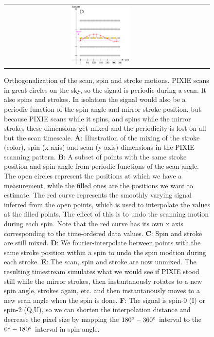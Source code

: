 \documentclass{article}
\begin{document}
\begin{figure}
\begin{tabular}{ccc}
		\includegraphics[width=0.32\textwidth]{plots/shift4.pdf}
	\end{tabular}
	\caption{Orthogonalization of the scan, spin and stroke
	motions. PIXIE scans in great circles on the sky, so the
	signal is periodic during a scan. It also spins and strokes.
	In isolation the signal would also be a periodic function
	of the spin angle and mirror stroke position, but because
	PIXIE scans while it spins, and spins
	while the mirror strokes these dimensions get mixed and the
	periodicity is lost on all but the scan timescale.
	\textbf{A}: Illustration of the mixing of the stroke (color),
	spin (x-axis) and scan (y-axis) dimensions in the PIXIE scanning
	pattern. \textbf{B}: A subset of points with the same stroke
	position and spin angle from periodic functions of the scan
	angle. The open circles represent the positions at which
	we have a measurement, while the filled ones are the positions
	we want to estimate. The red curve represents the smoothly
	varying signal inferred from the open points, which is used to
	interpolate the values at the filled points. The effect of
	this is to undo the scanning motion during each spin.
	Note that the red curve has its own x axis corresponding
	to the time-ordered data values.
	\textbf{C}: Spin and stroke are still
	mixed. \textbf{D}: We fourier-interpolate between points with
	the same stroke position within a spin to undo the spin
	modtion during each stroke. \textbf{E}: The scan, spin and stroke
	are now unmixed. The resulting timestream simulates what we would
	see if PIXIE stood still while the mirror strokes, then
	instantanously rotates to a new spin angle, strokes again, etc.
	and then instantanously moves to a new scan angle when the spin is done.
	\textbf{F}: The signal is spin-0 (I) or spin-2 (Q,U), so we can
	shorten the interpolation distance and decrease the pixel size
	by mapping the $180\degree-360\degree$ interval to the $0\degree-
	180\degree$ interval in spin angle.}
	\label{fig:shift}
\end{figure}
\end{document}
